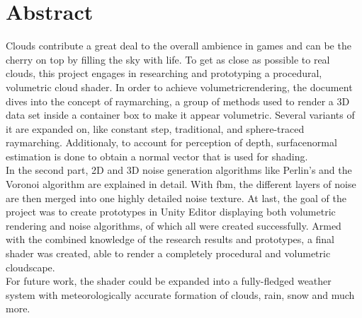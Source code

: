 \section*{Abstract}
Clouds contribute a great deal to the overall ambience in games and can be the cherry on top by filling the sky with life.
To get as close as possible to real clouds, this project engages in researching and prototyping a \gls{procedural}, volumetric cloud shader.
\emptyline
In order to achieve \gls{volumetricrendering}, the document dives into the concept of \gls{raymarching}, a group of methods used to render a 3D data set inside a container box to make it appear volumetric.
Several variants of it are expanded on, like constant step, traditional, and sphere-traced \gls{raymarching}. Additionaly, to account for perception of depth, \gls{surfacenormal} estimation is done to obtain a normal vector that is used for shading.
\\
In the second part, 2D and 3D \gls{noise} generation algorithms like Perlin's and the Voronoi algorithm are explained in detail. With \gls{fbm}, the different layers of noise are then merged into one highly detailed noise texture.
\emptyline
At last, the goal of the project was to create prototypes in Unity Editor displaying both volumetric rendering and noise algorithms, of which all were created successfully.
Armed with the combined knowledge of the research results and prototypes, a final shader was created, able to render a completely \gls{procedural} and volumetric cloudscape.
\\
For future work, the shader could be expanded into a fully-fledged weather system with meteorologically accurate formation of clouds, rain, snow and much more.